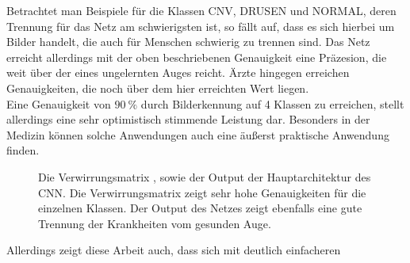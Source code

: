 %
Betrachtet man Beispiele für die Klassen CNV, DRUSEN und NORMAL, deren
Trennung für das Netz am schwierigsten ist, so fällt auf, dass es sich hierbei
um Bilder handelt, die auch für Menschen schwierig zu trennen sind. Das Netz
erreicht allerdings mit der oben beschriebenen Genauigkeit eine Präzesion, die
weit über der eines ungelernten Auges reicht. Ärzte hingegen erreichen
Genauigkeiten, die noch über dem hier erreichten Wert liegen.\\
Eine Genauigkeit von $\SI{90}{\percent}$ durch Bilderkennung auf 4 Klassen zu
erreichen, stellt allerdings eine sehr optimistisch stimmende Leistung dar.
Besonders in der Medizin können solche Anwendungen auch eine äußerst praktische
Anwendung finden.
\newpage
%
\begin{figure}[h!]
  \caption{Die Verwirrungsmatrix \protect{}, sowie der Output \protect{} der Hauptarchitektur des CNN. Die Verwirrungsmatrix zeigt sehr hohe Genauigkeiten für die einzelnen Klassen. Der Output des Netzes zeigt ebenfalls eine gute Trennung der Krankheiten vom gesunden Auge.}
  \label{fig:erg}
\end{figure}
%
Allerdings zeigt diese Arbeit auch, dass sich mit deutlich einfacheren
